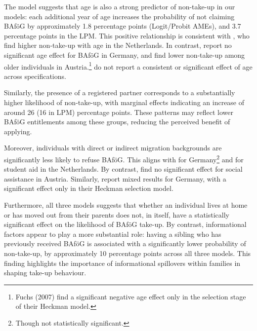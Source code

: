 


The model suggests that age is also a strong predictor of non-take-up in our models: each additional year of age increases the probability of not claiming BAföG by approximately 1.8 percentage points (Logit/Probit AMEs), and 3.7 percentage points in the LPM. 
This positive relationship is consistent with \cite{konijn_quantifying_2023}, who find higher non-take-up with age in the Netherlands. 
In contrast, \cite{herber_non-take-up_2019} report no significant age effect for BAföG in Germany, and \cite{fuchs_austria_2007} find lower non-take-up among older individuals in Austria.\footnote{Fuchs (2007) find a significant negative age effect only in the selection stage of their Heckman model.}
\cite{frick_claim_2007} do not report a consistent or significant effect of age across specifications.

Similarly, the presence of a registered partner corresponds to a substantially higher likelihood of non-take-up, with marginal effects indicating an increase of around 26 (16 in LPM) percentage points. 
These patterns may reflect lower BAföG entitlements among these groups, reducing the perceived benefit of applying. 


Moreover, individuals with direct or indirect migration backgrounds are significantly less likely to refuse BAföG. 
This aligns with \cite{herber_non-take-up_2019} for Germany\footnote{Though not statistically significant.} and \cite{konijn_quantifying_2023} for student aid in the Netherlands. 
By contrast, \cite{fuchs_austria_2007} find no significant effect for social assistance in Austria. 
Similarly, \cite{frick_claim_2007} report mixed results for Germany, with a significant effect only in their Heckman selection model.

Furthermore, all three models suggests that whether an individual lives at home or has moved out from their parents does not, in itself, have a statistically significant effect on the likelihood of BAföG take-up. 
By contrast, informational factors appear to play a more substantial role: having a sibling who has previously received BAföG is associated with a significantly lower probability of non-take-up, by approximately 10 percentage points across all three models. 
This finding highlights the importance of informational spillovers within families in shaping take-up behaviour. 

